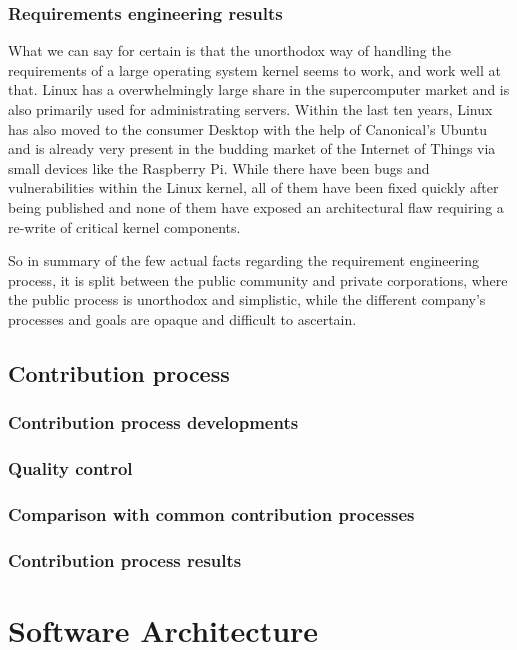 \documentclass{sig-alternate-05-2015}
\begin{document}
\subsubsection{Requirements engineering results}

What we can say for certain is that the unorthodox way of handling the requirements of a large operating system kernel seems to work, and work well at that.
Linux has a overwhelmingly large share in the supercomputer market and is also primarily used for administrating servers.
Within the last ten years, Linux has also moved to the consumer Desktop with the help of Canonical's Ubuntu and is already very present in the budding market of the Internet of Things via small devices like the Raspberry Pi.
While there have been bugs and vulnerabilities within the Linux kernel, all of them have been fixed quickly after being published and none of them have exposed an architectural flaw requiring a re-write of critical kernel components.

So in summary of the few actual facts regarding the requirement engineering process, it is split between the public community and private corporations, where the public process is unorthodox and simplistic, while the different company's processes and goals are opaque and difficult to ascertain.

\subsection{Contribution process}

\subsubsection{Contribution process developments}
\subsubsection{Quality control}
\subsubsection{Comparison with common contribution processes}
\subsubsection{Contribution process results}

\section{Software Architecture}
\end{document}
